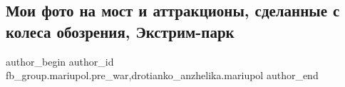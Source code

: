  
 
 
 
 

\subsection{Мои фото на мост и аттракционы, сделанные с колеса обозрения, Экстрим-парк}
\label{sec:23_01_2023.fb.fb_group.mariupol.pre_war.4.moi_foto_na_most_i_a}
 
\ifcmt
 author_begin
   author_id fb_group.mariupol.pre_war,drotianko_anzhelika.mariupol
 author_end
\fi
